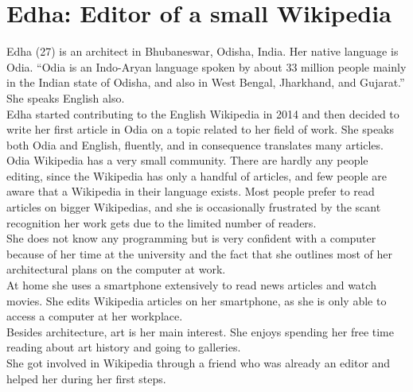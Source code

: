 \section{Edha: Editor of a small Wikipedia}
Edha (27) is an architect in Bhubaneswar, Odisha, India. Her native language is Odia. ``Odia is an Indo-Aryan language spoken by about 33 million people mainly in the Indian state of Odisha, and also in West Bengal, Jharkhand, and Gujarat.'' \citep{odia} She speaks English also.\\
Edha started contributing to the English Wikipedia in 2014 and then decided to write her first article in Odia on a topic related to her field of work. She speaks both Odia and English, fluently, and in consequence translates many articles. \\
Odia Wikipedia has a very small community. There are hardly any people editing, since the Wikipedia has only a handful of articles, and few people are aware that a Wikipedia in their language exists. Most people prefer to read articles on bigger Wikipedias, and she is occasionally frustrated by the scant recognition her work gets due to the limited number of readers. \\
She does not know any programming but is very confident with a computer because of her time at the university and the fact that she outlines most of her architectural plans on the computer at work. \\
At home she uses a smartphone extensively to read news articles and watch movies. She edits Wikipedia articles on her smartphone, as she is only able to access a computer at her workplace. \\  
Besides architecture, art is her main interest. She enjoys spending her free time reading about art history and going to galleries. \\
She got involved in Wikipedia through a friend who was already an editor and helped her during her first steps.

